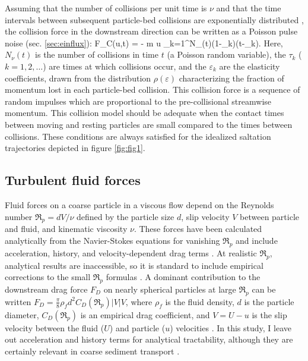Assuming that the number of collisions per unit time is $\nu$ and that the time intervals between subsequent particle-bed collisions are exponentially distributed \citep{Gordon1972}, the collision force in the downstream direction can be written as a Poisson pulse noise (sec. \ref{sec:einflux}):
\be F_C(u,t) = - m u \sum_{k=1}^{N_\nu(t)}(1-\varepsilon_k)\delta(t-\tau_k). \label{eq:col} \ee
Here, $N_\nu(t)$ is the number of collisions in time $t$ (a Poisson random variable), the $\tau_k$ ($k=1,2,\dots$) are times at which collisions occur, and the $\varepsilon_k$ are the elasticity coefficients, drawn from the distribution $\rho(\varepsilon)$ characterizing the fraction of momentum lost in each particle-bed collision.
This collision force is a sequence of random impulses which are proportional to the pre-collisional streamwise momentum. This collision model should be adequate when the contact times between moving and resting particles are small compared to the times between collisions. These conditions are always satisfied for the idealized saltation trajectories depicted in figure \ref{fig:fig1}.

\subsection{Turbulent fluid forces}
Fluid forces on a coarse particle in a viscous flow depend on the Reynolds number $\Re_p = d V/\nu$ defined by the particle size $d$, slip velocity $V$ between particle and fluid, and kinematic viscosity $\nu$.
These forces have been calculated analytically from the Navier-Stokes equations for vanishing $\Re_p$ and include acceleration, history, and velocity-dependent drag terms \citep{Hjelmfelt1966, Maxey1983, Auton1987}.
At realistic $\Re_p$, analytical results are inaccessible, so it is standard to include empirical corrections to the small $\Re_p$ formulas \citep{Schmeeckle2007,Clift1978}.
A dominant contribution to the downstream drag force $F_D$ on nearly spherical particles at large $\Re_p$ can be written $F_D = \frac{\pi}{8}
\rho_f d^2 C_D(\Re_p) |V|V$, where $\rho_f$ is the fluid density, $d$ is the particle diameter, $C_D(\Re_p)$ is an empirical drag coefficient, and $V = U-u$ is the slip velocity between the fluid ($U$) and particle ($u$) velocities \citep{Coleman1967, Schmeeckle2007, Dwivedi2012}.
In this study, I leave out acceleration and history terms for analytical tractability, although they are certainly relevant in coarse sediment transport \citep{Michaelides1997,Armenio2001}.

